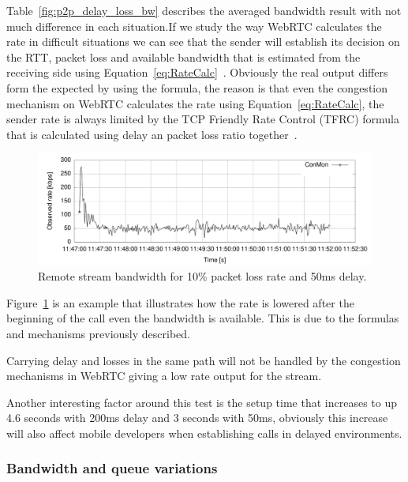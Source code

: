 Table~\ref{fig:p2p_delay_loss_bw} describes the averaged bandwidth result with not much difference in each situation.If we study the way WebRTC calculates the rate in difficult situations we can see that the sender will establish its decision on the RTT, packet loss and available bandwidth that is estimated from the receiving side using Equation~\ref{eq:RateCalc}~\cite{alvestrandCongestion2012}. Obviously the real output differs form the expected by using the formula, the reason is that even the congestion mechanism on WebRTC calculates the rate using Equation~\ref{eq:RateCalc}, the sender rate is always limited by the TCP Friendly Rate Control (TFRC) formula that is calculated using delay an packet loss ratio together~\cite{tfrc}.

 \begin{figure}[h]
  \centering
    \includegraphics[width=1\textwidth]{./figures/plr10_rtt50ms_RV.pdf}
      \caption[Remote stream bandwidth for 10\% packet loss rate and 50ms delay]{Remote stream bandwidth for 10\% packet loss rate and 50ms delay.}
	\label{fig:bw_plr10_rtt50ms}
\end{figure}

Figure~\ref{fig:bw_plr10_rtt50ms} is an example that illustrates how the rate is lowered after the beginning of the call even the bandwidth is available. This is due to the formulas and mechanisms previously described.

Carrying delay and losses in the same path will not be handled by the congestion mechanisms in WebRTC giving a low rate output for the stream.

Another interesting factor around this test is the setup time that increases to up 4.6 seconds with 200ms delay and 3 seconds with 50ms, obviously this increase will also affect mobile developers when establishing calls in delayed environments.

\subsubsection{Bandwidth and queue variations}

